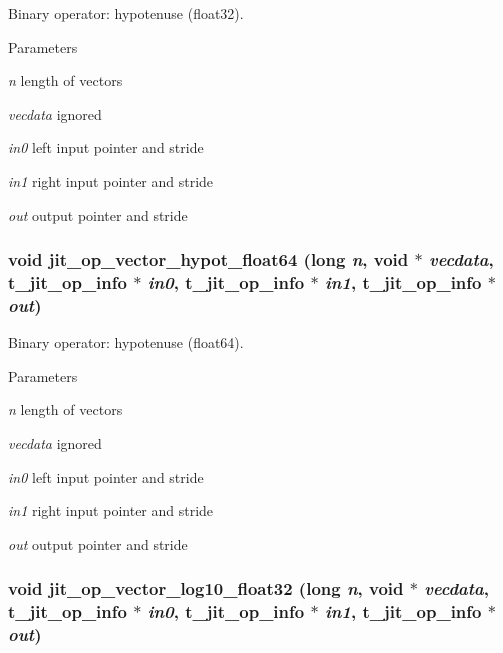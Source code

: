 Binary operator: hypotenuse (float32). 
\begin{DoxyParams}{Parameters}
\item[{\em n}]length of vectors \item[{\em vecdata}]ignored \item[{\em in0}]left input pointer and stride \item[{\em in1}]right input pointer and stride \item[{\em out}]output pointer and stride \end{DoxyParams}
\hypertarget{group__opvecmod_ga6eb8c731eafa72ddc056782f7c3449d0}{
\subsubsection[{jit\_\-op\_\-vector\_\-hypot\_\-float64}]{\setlength{\rightskip}{0pt plus 5cm}void jit\_\-op\_\-vector\_\-hypot\_\-float64 (long {\em n}, \/  void $\ast$ {\em vecdata}, \/  {\bf t\_\-jit\_\-op\_\-info} $\ast$ {\em in0}, \/  {\bf t\_\-jit\_\-op\_\-info} $\ast$ {\em in1}, \/  {\bf t\_\-jit\_\-op\_\-info} $\ast$ {\em out})}}
\label{group__opvecmod_ga6eb8c731eafa72ddc056782f7c3449d0}


Binary operator: hypotenuse (float64). 
\begin{DoxyParams}{Parameters}
\item[{\em n}]length of vectors \item[{\em vecdata}]ignored \item[{\em in0}]left input pointer and stride \item[{\em in1}]right input pointer and stride \item[{\em out}]output pointer and stride \end{DoxyParams}
\hypertarget{group__opvecmod_ga8d105c8f794e923c3858dea7dc23eea1}{
\subsubsection[{jit\_\-op\_\-vector\_\-log10\_\-float32}]{\setlength{\rightskip}{0pt plus 5cm}void jit\_\-op\_\-vector\_\-log10\_\-float32 (long {\em n}, \/  void $\ast$ {\em vecdata}, \/  {\bf t\_\-jit\_\-op\_\-info} $\ast$ {\em in0}, \/  {\bf t\_\-jit\_\-op\_\-info} $\ast$ {\em in1}, \/  {\bf t\_\-jit\_\-op\_\-info} $\ast$ {\em out})}}
\label{group__opvecmod_ga8d105c8f794e923c3858dea7dc23eea1}


